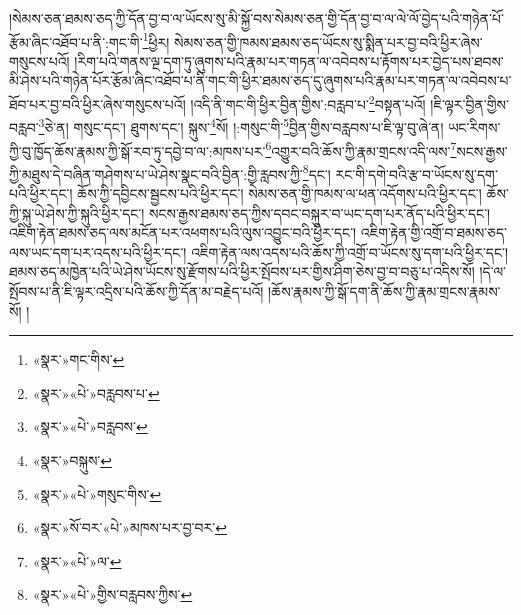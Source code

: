 །སེམས་ཅན་ཐམས་ཅད་ཀྱི་དོན་བྱ་བ་ལ་ཡོངས་སུ་མི་སྐྱོ་བས་སེམས་ཅན་གྱི་དོན་བྱ་བ་ལ་ལེ་ལོ་བྱེད་པའི་གཉེན་པོ་རྩོམ་ཞིང་འཐོབ་པ་ནི་:གང་གི་\footnote{«སྣར་»གང་གིས་}ཕྱིར། སེམས་ཅན་གྱི་ཁམས་ཐམས་ཅད་ཡོངས་སུ་སྨིན་པར་བྱ་བའི་ཕྱིར་ཞེས་གསུངས་པའོ། །རིག་པའི་གནས་ལྔ་དག་ཏུ་ཞུགས་པའི་རྣམ་པར་གཏན་ལ་འབེབས་པ་རྟོགས་པར་བྱེད་པས་ཐབས་མི་ཤེས་པའི་གཉེན་པོར་རྩོམ་ཞིང་འཐོབ་པ་ནི་གང་གི་ཕྱིར་ཐམས་ཅད་དུ་ཞུགས་པའི་རྣམ་པར་གཏན་ལ་འབེབས་པ་ཐོབ་པར་བྱ་བའི་ཕྱིར་ཞེས་གསུངས་པའོ། །འདི་ནི་གང་གི་ཕྱིར་བྱིན་གྱིས་:བརླབ་པ་\footnote{«སྣར་»«པེ་»བརླབས་པ་}བསྟན་པའོ། །ཇི་ལྟར་བྱིན་གྱིས་བརླབ་\footnote{«སྣར་»«པེ་»བརླབས་}ཅེ་ན། གསུང་དང་། ཐུགས་དང་། སྐུས་\footnote{«སྣར་»བསྐུས་}སོ། །:གསུང་གི་\footnote{«སྣར་»«པེ་»གསུང་གིས་}བྱིན་གྱིས་བརླབས་པ་ཇི་ལྟ་བུ་ཞེ་ན། ཡང་རིགས་ཀྱི་བུ་ཁྱོད་ཆོས་རྣམས་ཀྱི་སྒོ་རབ་ཏུ་དབྱེ་བ་ལ་:མཁས་པར་\footnote{«སྣར་»སོ་བར་«པེ་»མཁས་པར་བྱ་བར་}འགྱུར་བའི་ཆོས་ཀྱི་རྣམ་གྲངས་འདི་ལས་\footnote{«སྣར་»«པེ་»ལ་}སངས་རྒྱས་ཀྱི་མཐུས་དེ་བཞིན་གཤེགས་པ་ཡེ་ཤེས་སྣང་བའི་བྱིན་:གྱི་རླབས་ཀྱི་\footnote{«སྣར་»«པེ་»གྱིས་བརླབས་ཀྱིས་}དང་། རང་གི་དགེ་བའི་རྩ་བ་ཡོངས་སུ་དག་པའི་ཕྱིར་དང་། ཆོས་ཀྱི་དབྱིངས་སྦྱངས་པའི་ཕྱིར་དང་། སེམས་ཅན་གྱི་ཁམས་ལ་ཕན་འདོགས་པའི་ཕྱིར་དང་། ཆོས་ཀྱི་སྐུ་ཡེ་ཤེས་ཀྱི་སྐུའི་ཕྱིར་དང་། སངས་རྒྱས་ཐམས་ཅད་ཀྱིས་དབང་བསྐུར་བ་ཡང་དག་པར་ནོད་པའི་ཕྱིར་དང་། འཇིག་རྟེན་ཐམས་ཅད་ལས་མངོན་པར་འཕགས་པའི་ལུས་འབྱུང་བའི་ཕྱིར་དང་། འཇིག་རྟེན་གྱི་འགྲོ་བ་ཐམས་ཅད་ལས་ཡང་དག་པར་འདས་པའི་ཕྱིར་དང་། འཇིག་རྟེན་ལས་འདས་པའི་ཆོས་ཀྱི་འགྲོ་བ་ཡོངས་སུ་དག་པའི་ཕྱིར་དང་། ཐམས་ཅད་མཁྱེན་པའི་ཡེ་ཤེས་ཡོངས་སུ་རྫོགས་པའི་ཕྱིར་སྤོབས་པར་གྱིས་ཤིག་ཅེས་བྱ་བ་བཅུ་པ་འདིས་སོ། །དེ་ལ་སྤོབས་པ་ནི་ཇི་ལྟར་འདྲིས་པའི་ཆོས་ཀྱི་དོན་མ་བརྗེད་པའོ། །ཆོས་རྣམས་ཀྱི་སྒོ་དག་ནི་ཆོས་ཀྱི་རྣམ་གྲངས་རྣམས་སོ། །

